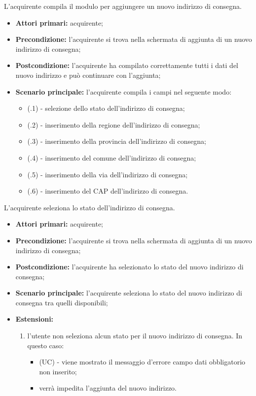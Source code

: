 L'acquirente compila il modulo per aggiungere un nuovo indirizzo di consegna.
\begin{itemize}
	\item \textbf{Attori primari:} acquirente;
	\item \textbf{Precondizione:} l'acquirente si trova nella schermata di aggiunta di un nuovo indirizzo di consegna;
	\item \textbf{Postcondizione:} l'acquirente ha compilato correttamente tutti i dati del nuovo indirizzo e può continuare con l'aggiunta;
	\item \textbf{Scenario principale:} l'acquirente compila i campi nel seguente modo:
	\begin{itemize}
		\item (\actualSubUC.1) - selezione dello stato dell'indirizzo di consegna;
		\item (\actualSubUC.2) - inserimento della regione dell'indirizzo di consegna;
		\item (\actualSubUC.3) - inserimento della provincia dell'indirizzo di consegna;
		\item (\actualSubUC.4) - inserimento del comune dell'indirizzo di consegna;
		\item (\actualSubUC.5) - inserimento della via dell'indirizzo di consegna;
		\item (\actualSubUC.6) - inserimento del CAP dell'indirizzo di consegna.
	\end{itemize}
\end{itemize}

\resetSubSubUC

L'acquirente seleziona lo stato dell'indirizzo di consegna.
\begin{itemize}
    \item \textbf{Attori primari:} acquirente;
    \item \textbf{Precondizione:} l'acquirente si trova nella schermata di aggiunta di un nuovo indirizzo di consegna;
    \item \textbf{Postcondizione:} l'acquirente ha selezionato lo stato del nuovo indirizzo di consegna;
    \item \textbf{Scenario principale:} l'acquirente seleziona lo stato del nuovo indirizzo di consegna tra quelli disponibili;
    \item \textbf{Estensioni:}
    \begin{enumerate}[label=\lett]
        \item l'utente non seleziona alcun stato per il nuovo indirizzo di consegna. In questo caso:
        \begin{itemize}
            \item (UC) - viene mostrato il messaggio d'errore campo dati obbligatorio non inserito;
            \item verrà impedita l'aggiunta del nuovo indirizzo.
        \end{itemize}
    \end{enumerate}
\end{itemize}

